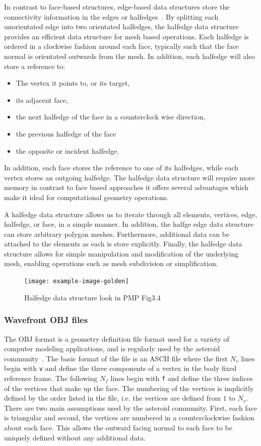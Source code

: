 In contrast to face-based structures, edge-based data structures store the connectivity information in the edges or halfedges~\cite{botsch2010,orourke1998}.
By splitting each unorientated edge into two orientated halfedges, the halfedge data structure provides an efficient data structure for mesh based operations.
Each halfedge is ordered in a clockwise fashion around each face, typically such that the face normal is orientated outwards from the mesh.
In addition, each halfedge will also store a reference to:
\begin{itemize}
    \item The vertex it points to, or its target,
    \item its adjacent face,
    \item the next halfedge of the face in a counterclock wise direction,
    \item the previous halfedge of the face
    \item the opposite or incident halfedge.
\end{itemize}
In addition, each face stores the reference to one of its halfedges, while each vertex stores an outgoing halfedge. 
The halfedge data structure will require more memory in contrast to face based approaches it offers several advantages which make it ideal for computational geometry operations.

A halfedge data structure allows us to iterate through all elements, vertices, edge, halfedge, or face, in a simple manner.
In addition, the halfge edge data structure can store arbitrary polygon meshes.
Furthermore, additional data can be attached to the elements as each is store explicitly.
Finally, the halfedge data structure allows for simple manipulation and modification of the underlying mesh, enabling operations such as mesh subdivision or simplification.

\begin{figure}
    \centering
    \texttt{[image: example-image-golden]}
    \caption{Halfedge data structure look in PMP Fig3.4~\label{fig:halfedge_data_structure}}
\end{figure}

\subsubsection{Wavefront OBJ files}
The OBJ format is a geometry definition file format used for a variety of computer modeling applications, and is regularly used by the asteroid community~\cite{neese2004}.
The basic format of the file is an ASCII file where the first \( N_v\) lines begin with \texttt{v} and define the three components of a vertex in the body fixed reference frame.
The following \( N_f\) lines begin with \texttt{f} and define the three indices of the vertices that make up the face.
The numbering of the vertices is implicitly defined by the order listed in the file, i.e. the vertices are defined from \( 1 \) to \( N_v\).
There are two main assumptions used by the asteroid community.
First, each face is triangular and second, the vertices are numbered in a counterclockwise fashion about each face.
This allows the outward facing normal to each face to be uniquely defined without any additional data.

